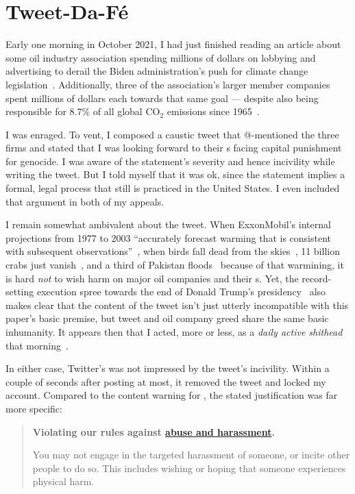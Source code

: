 
\section{Tweet-Da-F\'e}
\label{sec:tweet:da:fe}

Early one morning in October 2021, I had just finished reading an article about
some oil industry association spending millions of dollars on lobbying and
advertising to derail the Biden administration's push for climate change
legislation~\cite{Tabuchi2021}. Additionally, three of the association's larger
member companies spent millions of dollars each towards that same goal ---
despite also being responsible for 8.7\% of all global CO$_2$ emissions since
1965~\cite{TaylorWatts2019}.

I was enraged. To vent, I composed a caustic tweet that @-mentioned the three
firms and stated that I was looking forward to their \CEO{}s facing capital
punishment for genocide. I was aware of the statement's severity and hence
incivility while writing the tweet. But I told myself that it was ok, since the
statement implies a formal, legal process that still is practiced in the United
States. I even included that argument in both of my appeals.

I remain somewhat ambivalent about the tweet. When ExxonMobil's internal
projections from 1977 to 2003 ``accurately forecast warming that is consistent
with subsequent observations''~\cite{SupranRahmstorf2023}, when birds fall dead
from the skies~\cite{Dave2022}, 11 billion crabs just
vanish~\cite{Olmstead2022}, and a third of Pakistan floods~\cite{Chughtai2022}
because of that warmining, it is hard \emph{not} to wish harm on major oil
companies and their \CEO{}s. Yet, the record-setting execution spree towards the
end of Donald Trump's
presidency~\cite{Arnsdorf2020,Kovarsky2022,SuebsaengReis2023} also makes clear
that the content of the tweet isn't just utterly incompatible with this paper's
basic premise, but tweet and oil company greed share the same basic inhumanity.
It appears then that I acted, more or less, as a \emph{daily active shithead}
that morning~\cite{Sherman2021}.

In either case, Twitter's \AI{} was not impressed by the tweet's incivility.
Within a couple of seconds after posting at most, it removed the tweet and
locked my account. Compared to the content warning for \DALLE, the stated
justification was far more specific:

\begin{quote}
\openfat\textbf{Violating our rules against
\href{https://web.archive.org/web/20220905021323/https://help.twitter.com/en/rules-and-policies/abusive-behavior}{abuse
and harassment}.}

You may not engage in the targeted harassment of someone, or incite other people
to do so. This includes wishing or hoping that someone experiences physical
harm.\closefat{}
\end{quote}

